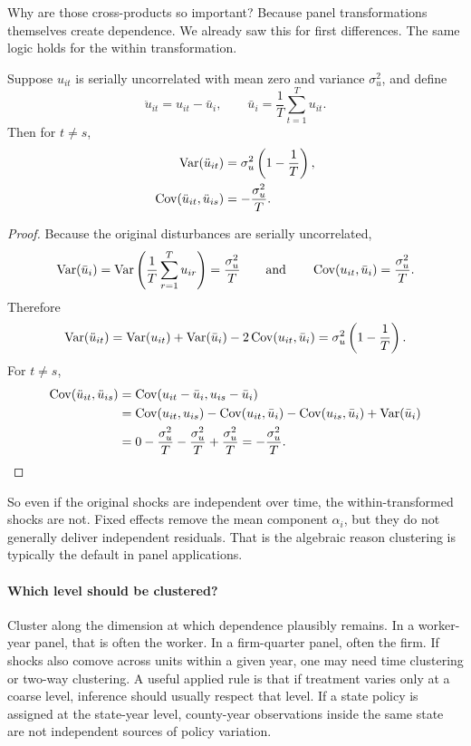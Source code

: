 Why are those cross-products so important? Because panel transformations themselves create dependence. We already saw this for first differences. The same logic holds for the within transformation.

\begin{thmN}
Suppose $u_{it}$ is serially uncorrelated with mean zero and variance $\sigma_u^2$, and define
\[
\ddot{u}_{it}=u_{it}-\bar{u}_i,
\qquad
\bar{u}_i=\frac{1}{T}\sum_{t=1}^T u_{it}.
\]
Then for $t\neq s$,
\begin{align}
\operatorname{Var}(\ddot{u}_{it}) &= \sigma_u^2\left(1-\frac{1}{T}\right),
\label{eq:demeaned_var}
\\
\operatorname{Cov}(\ddot{u}_{it},\ddot{u}_{is}) &= -\frac{\sigma_u^2}{T}.
\label{eq:demeaned_cov}
\end{align}
\label{thm:demeaned_corr}
\end{thmN}

\begin{proof}
Because the original disturbances are serially uncorrelated,
\[
\operatorname{Var}(\bar{u}_i)=\operatorname{Var}\left(\frac{1}{T}\sum_{r=1}^T u_{ir}\right)=\frac{\sigma_u^2}{T}
\qquad \text{and} \qquad
\operatorname{Cov}(u_{it},\bar{u}_i)=\frac{\sigma_u^2}{T}.
\]
Therefore
\[
\operatorname{Var}(\ddot{u}_{it})
=
\operatorname{Var}(u_{it})+\operatorname{Var}(\bar{u}_i)-2\operatorname{Cov}(u_{it},\bar{u}_i)
=
\sigma_u^2\left(1-\frac{1}{T}\right).
\]
For $t\neq s$,
\begin{align*}
\operatorname{Cov}(\ddot{u}_{it},\ddot{u}_{is})
&=
\operatorname{Cov}(u_{it}-\bar{u}_i,u_{is}-\bar{u}_i) \\
&=
\operatorname{Cov}(u_{it},u_{is})-\operatorname{Cov}(u_{it},\bar{u}_i)-\operatorname{Cov}(u_{is},\bar{u}_i)+\operatorname{Var}(\bar{u}_i) \\
&=
0-\frac{\sigma_u^2}{T}-\frac{\sigma_u^2}{T}+\frac{\sigma_u^2}{T}
=
-\frac{\sigma_u^2}{T}.
\end{align*}
\end{proof}

So even if the original shocks are independent over time, the within-transformed shocks are not. Fixed effects remove the mean component $\alpha_i$, but they do not generally deliver independent residuals. That is the algebraic reason clustering is typically the default in panel applications.

\paragraph{Which level should be clustered?}
Cluster along the dimension at which dependence plausibly remains. In a worker-year panel, that is often the worker. In a firm-quarter panel, often the firm. If shocks also comove across units within a given year, one may need time clustering or two-way clustering. A useful applied rule is that if treatment varies only at a coarse level, inference should usually respect that level. If a state policy is assigned at the state-year level, county-year observations inside the same state are not independent sources of policy variation.

